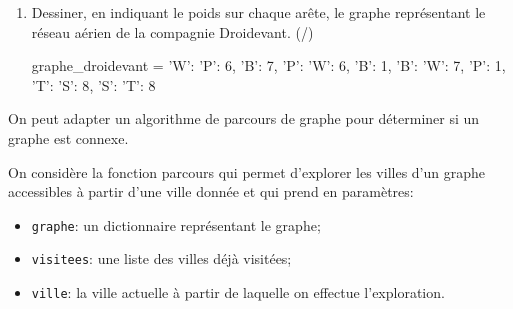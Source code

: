 \begin{enumerate}[resume=monDS]
    \item Dessiner, en indiquant le poids sur chaque arête, le graphe représentant le réseau aérien de la compagnie Droidevant. (/)

\begin{minipage}{0.48\linewidth}
    \begin{CodePythontexAlt}[TaillePolice=\large, Largeur=1\linewidth,Centre,Lignes=true,PremLigne=1]{}
graphe_droidevant = { 
    'W': {'P': 6, 'B': 7},
    'P': {'W': 6, 'B': 1}, 
    'B': {'W': 7, 'P': 1}, 
    'T': {'S': 8}, 
    'S': {'T': 8} }
    \end{CodePythontexAlt}
\end{minipage}\hfill{}
\begin{minipage}{0.48\linewidth}
    \begin{blocvisible}[height=3.5]
\end{blocvisible}
\end{minipage}
\end{enumerate}
\medskip

On peut adapter un algorithme de parcours de graphe pour déterminer si un graphe est connexe.

On considère la fonction parcours qui permet d'explorer les villes d'un graphe accessibles à partir d'une ville donnée et qui prend en paramètres:
\begin{itemize}
    \item \texttt{graphe}: un dictionnaire représentant le graphe;
    \item \texttt{visitees}: une liste des villes déjà visitées;
    \item \texttt{ville}: la ville actuelle à partir de laquelle on effectue l'exploration.
\end{itemize}

